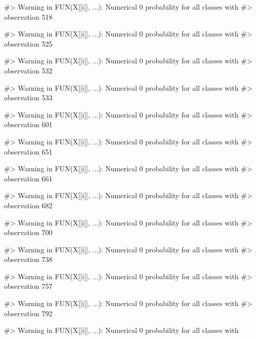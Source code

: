 \begin{Schunk}
\begin{Soutput}
#> Warning in FUN(X[[i]], ...): Numerical 0 probability for all classes with
#> observation 518
\end{Soutput}
\begin{Soutput}
#> Warning in FUN(X[[i]], ...): Numerical 0 probability for all classes with
#> observation 525
\end{Soutput}
\begin{Soutput}
#> Warning in FUN(X[[i]], ...): Numerical 0 probability for all classes with
#> observation 532
\end{Soutput}
\begin{Soutput}
#> Warning in FUN(X[[i]], ...): Numerical 0 probability for all classes with
#> observation 533
\end{Soutput}
\begin{Soutput}
#> Warning in FUN(X[[i]], ...): Numerical 0 probability for all classes with
#> observation 601
\end{Soutput}
\begin{Soutput}
#> Warning in FUN(X[[i]], ...): Numerical 0 probability for all classes with
#> observation 651
\end{Soutput}
\begin{Soutput}
#> Warning in FUN(X[[i]], ...): Numerical 0 probability for all classes with
#> observation 661
\end{Soutput}
\begin{Soutput}
#> Warning in FUN(X[[i]], ...): Numerical 0 probability for all classes with
#> observation 682
\end{Soutput}
\begin{Soutput}
#> Warning in FUN(X[[i]], ...): Numerical 0 probability for all classes with
#> observation 700
\end{Soutput}
\begin{Soutput}
#> Warning in FUN(X[[i]], ...): Numerical 0 probability for all classes with
#> observation 738
\end{Soutput}
\begin{Soutput}
#> Warning in FUN(X[[i]], ...): Numerical 0 probability for all classes with
#> observation 757
\end{Soutput}
\begin{Soutput}
#> Warning in FUN(X[[i]], ...): Numerical 0 probability for all classes with
#> observation 792
\end{Soutput}
\begin{Soutput}
#> Warning in FUN(X[[i]], ...): Numerical 0 probability for all classes with

\end{Soutput}
\end{Schunk}
